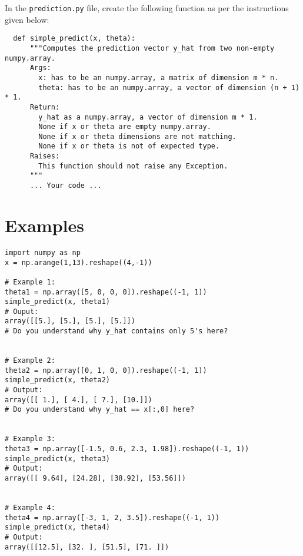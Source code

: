 In the \texttt{prediction.py} file, create the following function as per the instructions given below:
\par
\begin{verbatim}
  def simple_predict(x, theta):
      """Computes the prediction vector y_hat from two non-empty numpy.array.
      Args:
        x: has to be an numpy.array, a matrix of dimension m * n.
        theta: has to be an numpy.array, a vector of dimension (n + 1) * 1.
      Return:
        y_hat as a numpy.array, a vector of dimension m * 1.
        None if x or theta are empty numpy.array.
        None if x or theta dimensions are not matching.
        None if x or theta is not of expected type.
      Raises:
        This function should not raise any Exception.
      """
      ... Your code ...
\end{verbatim}

\section*{Examples}

\begin{verbatim}
import numpy as np
x = np.arange(1,13).reshape((4,-1))

# Example 1:
theta1 = np.array([5, 0, 0, 0]).reshape((-1, 1))
simple_predict(x, theta1)
# Ouput:
array([[5.], [5.], [5.], [5.]])
# Do you understand why y_hat contains only 5's here?  


# Example 2:
theta2 = np.array([0, 1, 0, 0]).reshape((-1, 1))
simple_predict(x, theta2)
# Output:
array([[ 1.], [ 4.], [ 7.], [10.]])
# Do you understand why y_hat == x[:,0] here?  


# Example 3:
theta3 = np.array([-1.5, 0.6, 2.3, 1.98]).reshape((-1, 1))
simple_predict(x, theta3)
# Output:
array([[ 9.64], [24.28], [38.92], [53.56]])


# Example 4:
theta4 = np.array([-3, 1, 2, 3.5]).reshape((-1, 1))
simple_predict(x, theta4)
# Output:
array([[12.5], [32. ], [51.5], [71. ]])
\end{verbatim}